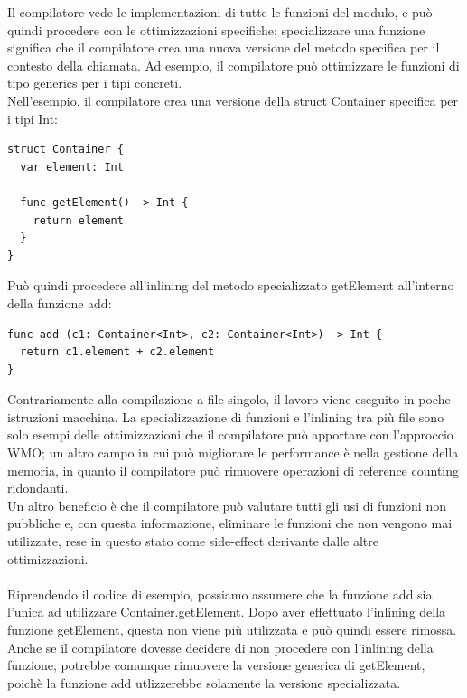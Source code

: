 Il compilatore vede le implementazioni di tutte le funzioni del modulo, e può quindi procedere con le ottimizzazioni specifiche; specializzare una funzione significa che il compilatore crea una nuova versione del metodo specifica per il contesto della chiamata. Ad esempio, il compilatore può ottimizzare le funzioni di tipo generics per i tipi concreti.\\
Nell'esempio, il compilatore crea una versione della struct Container specifica per i tipi Int: 
\begin{lstlisting}
struct Container {
  var element: Int

  func getElement() -> Int {
    return element
  }
}
\end{lstlisting}
Può quindi procedere all'inlining del metodo specializzato getElement all'interno della funzione add:
\begin{lstlisting}
func add (c1: Container<Int>, c2: Container<Int>) -> Int {
  return c1.element + c2.element
}
\end{lstlisting}
Contrariamente alla compilazione a file singolo, il lavoro viene eseguito in poche istruzioni macchina. La specializzazione di funzioni e l'inlining tra più file sono solo esempi delle ottimizzazioni che il compilatore può apportare con l'approccio WMO; un altro campo in cui può migliorare le performance è nella gestione della memoria, in quanto il compilatore può rimuovere operazioni di reference counting ridondanti.\\
Un altro beneficio è che il compilatore può valutare tutti gli usi di funzioni non pubbliche e, con questa informazione, eliminare le funzioni che non vengono mai utilizzate, rese in questo stato come side-effect derivante dalle altre ottimizzazioni.\\\\Riprendendo il codice di esempio, possiamo assumere che la funzione add sia l'unica ad utilizzare Container.getElement. Dopo aver effettuato l'inlining della funzione getElement, questa non viene più utilizzata e può quindi essere rimossa. Anche se il compilatore dovesse decidere di non procedere con l'inlining della funzione, potrebbe comunque rimuovere la versione generica di getElement, poichè la funzione add utlizzerebbe solamente la versione specializzata.
